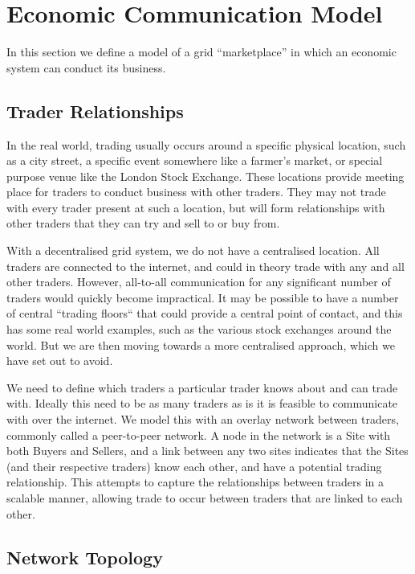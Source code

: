 \section{Economic Communication Model}
\label{SEC:METHOD:NETWORK}

In this section we define a model of a grid ``marketplace'' in which an economic
system can conduct its business.

\subsection{Trader Relationships}
\label{SEC:METHOD:RELATIONSHIPS}

In the real world, trading usually occurs around a specific physical location,
such as a city street, a specific event somewhere like a farmer's market, or
special purpose venue like the London Stock Exchange.  These locations provide
meeting place for traders to conduct business with other traders. They may not
trade with every trader present at such a location, but will form relationships
with other traders that they can try and sell to or buy from.

With a decentralised grid system, we do not have a centralised location. All
traders are connected to the internet, and could in theory trade with any and
all other traders. However, all-to-all communication for any significant number
of traders would quickly become impractical. It may be possible to have a
number of central ``trading floors`` that could provide a central point of
contact, and this has some real world examples, such as the various stock
exchanges around the world. But we are then moving towards a more centralised
approach, which we have set out to avoid.

We need to define which traders a particular trader knows about and can trade
with. Ideally this need to be as many traders as is it is feasible to
communicate with over the internet. We model this with an overlay network
between traders, commonly called a peer-to-peer network. A node in the network
is a Site with both Buyers and Sellers, and a link between any two sites
indicates that the Sites (and their respective traders) know each other, and
have a potential trading relationship. This attempts to capture the
relationships between traders in a scalable manner, allowing trade to occur
between traders that are linked to each other.


\subsection{Network Topology}

